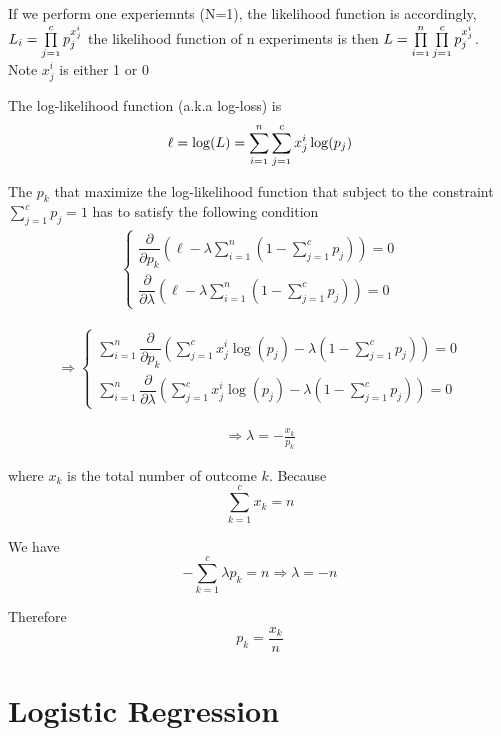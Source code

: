 \documentclass[12pt, oneside]{article}
\begin{document}
If we perform one experiemnts (N=1), the likelihood function is accordingly, 
$\mathnormal{L_i= \prod \limits_{j=1}^c p_{j}^{x^i_j}}$
the likelihood function of n experiments is then 
$\mathnormal{L= \prod \limits_{i=1}^n\prod \limits_{j=1}^c p_{j}^{ x^i_j}}$. Note $x_j^i$ is either 1 or 0

The log-likelihood function (a.k.a log-loss) is
$$\mathnormal{\ell=\log(L)=\sum\limits_{i=1}^n \sum\limits_{j=1}^c x_j^i \log(p_j)}$$

The $p_k$ that maximize the log-likelihood function that subject to the constraint $\sum\limits_{j=1}^c p_j=1$ has to satisfy the following condition
\begin{align*}
\begin{cases}
\dfrac{\partial}{\partial p_k} \left(\ell-\lambda \sum\limits_{i=1}^n(1-\sum\limits_{j=1}^c p_j)\right)=0\\
\dfrac{\partial}{\partial \lambda} \left(\ell-\lambda \sum\limits_{i=1}^n(1-\sum\limits_{j=1}^c p_j)\right)=0
\end{cases}
\end{align*}
 
\begin{align*}
\Rightarrow
\begin{cases}
\sum\limits_{i=1}^n\dfrac{\partial}{\partial p_k} \left(\sum\limits_{j=1}^c x_j^i \log(p_j)-\lambda (1-\sum\limits_{j=1}^c p_j)\right)=0\\
\sum\limits_{i=1}^n\dfrac{\partial}{\partial \lambda} \left(\sum\limits_{j=1}^c x_j^i \log(p_j)-\lambda (1-\sum\limits_{j=1}^c p_j)\right)=0
\end{cases}
\end{align*}


\begin{align*}
\Rightarrow
\lambda=-\frac{x_k}{p_k}
\end{align*}

where $x_k$ is the total number of outcome $k$. Because
\begin{equation*}
\sum\limits_{k=1}^c x_k=n
\end{equation*}

We have 
\begin{equation*}
-\sum\limits_{k=1}^c\lambda p_k=n \Rightarrow \lambda=-n
\end{equation*}

Therefore
\begin{equation}
p_k=\frac{x_k}{n}
\end{equation}

\section{Logistic Regression}
\end{document}
